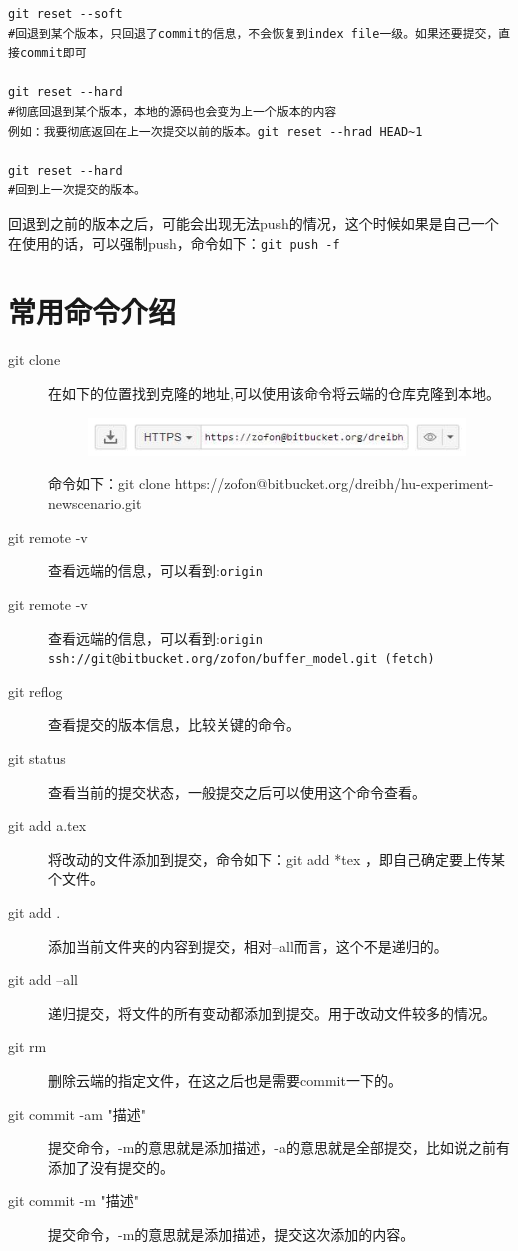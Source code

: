 \documentclass[a4paper,12pt]{ctexbook}
\begin{document}
\begin{flushleft}
\begin{verbatim}
git reset --soft
#回退到某个版本，只回退了commit的信息，不会恢复到index file一级。如果还要提交，直接commit即可

git reset --hard
#彻底回退到某个版本，本地的源码也会变为上一个版本的内容
例如：我要彻底返回在上一次提交以前的版本。git reset --hrad HEAD~1

git reset --hard
#回到上一次提交的版本。
\end{verbatim}
回退到之前的版本之后，可能会出现无法push的情况，这个时候如果是自己一个在使用的话，可以强制push，命令如下：\verb|git push -f|

\section{常用命令介绍}
\begin{description}
  \item[git clone] 在如下的位置找到克隆的地址,可以使用该命令将云端的仓库克隆到本地。
        \begin{figure}[H]
        \centering
        \includegraphics[width=10cm]{figures/clone_address.jpg}
        \end{figure}
        命令如下：git clone https://zofon@bitbucket.org/dreibh/hu-experiment-newscenario.git
  \item[git remote -v] 查看远端的信息，可以看到:\verb|origin|
  \item[git remote -v] 查看远端的信息，可以看到:\verb|origin  ssh://git@bitbucket.org/zofon/buffer_model.git (fetch)|
  \item[git reflog] 查看提交的版本信息，比较关键的命令。
  \item[git status] 查看当前的提交状态，一般提交之后可以使用这个命令查看。

  \item[git add a.tex] 将改动的文件添加到提交，命令如下：git add *tex ，即自己确定要上传某个文件。
  \item[git add .] 添加当前文件夹的内容到提交，相对--all而言，这个不是递归的。
  \item[git add --all] 递归提交，将文件的所有变动都添加到提交。用于改动文件较多的情况。

  \item[git rm] 删除云端的指定文件，在这之后也是需要commit一下的。

  \item[git commit -am "描述"] 提交命令，-m的意思就是添加描述，-a的意思就是全部提交，比如说之前有添加了没有提交的。
  \item[git commit -m  "描述"] 提交命令，-m的意思就是添加描述，提交这次添加的内容。


\end{description}
\end{flushleft}
\end{document}
